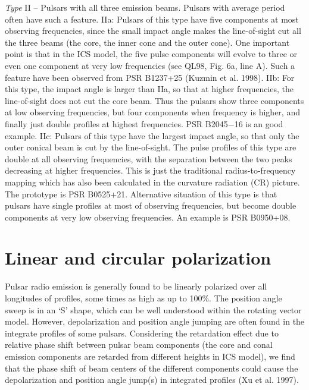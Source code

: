 \vspace{2mm}
\noindent
{\it Type} II -- Pulsars with all three
emission beams. Pulsars with average period often have such a
feature.
%
IIa: Pulsars of this type have five components at most observing
frequencies, since the small impact angle  makes the line-of-sight
cut all the three beams (the core, the inner cone and the outer
cone). One important point is that in the ICS model, the five
pulse components will evolve to three or even one component at
very low frequencies (see QL98, Fig. 6a, line A). Such a feature
have been observed from PSR B1237+25 (Kuzmin et al. 1998).
%
IIb: For this type, the impact angle is larger than IIa, so that
at higher frequencies, the line-of-sight does not cut the core
beam. Thus the pulsars show three components at low observing
frequencies, but four components when frequency is higher, and
finally just double profiles at highest frequencies. PSR
B2045$-$16 is an good example.
%
IIc: Pulsars of this type have the largest impact angle, so that
only the outer conical beam is cut by the line-of-sight. The pulse
profiles of this type are double at all observing frequencies,
with the separation between the two peaks decreasing at higher
frequencies. This is just the traditional radius-to-frequency
mapping which has also been calculated in the curvature radiation
(CR) picture. The prototype is PSR B0525+21.  Alternative
situation of this type is that pulsars have single profiles at
most of observing frequencies, but become double components at
very low observing frequencies. An example is PSR B0950+08.

\section{Linear and circular polarization}

Pulsar radio emission is generally found to be linearly polarized
over all longitudes of profiles, some times as high as up to
100\%. The position angle sweep is in an `S' shape, which can be
well understood within the rotating vector model. However,
depolarization and position angle jumping are often found in the
integrate profiles of some pulsars. Considering the retardation
effect due to relative phase shift between pulsar beam components
(the core and conal emission components are retarded from
different heights in ICS model), we find that the phase shift of
beam centers of the different components could cause the
depolarization and position angle jump(s) in integrated profiles
(Xu et al. 1997).

